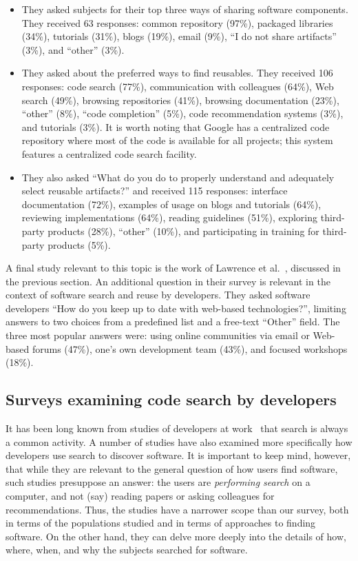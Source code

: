 \documentclass{casicswhitepaper}
\begin{document}
\begin{itemize}

\item They asked subjects for their top three ways of sharing software components.  They received 63 responses: common repository (97\%), packaged libraries (34\%), tutorials (31\%), blogs (19\%), email (9\%), ``I do not share artifacts'' (3\%), and ``other'' (3\%).

\item They asked about the preferred ways to find reusables.  They received 106 responses: code search (77\%), communication with colleagues (64\%), Web search (49\%), browsing repositories (41\%), browsing documentation (23\%), ``other'' (8\%), ``code completion'' (5\%), code recommendation systems (3\%), and tutorials (3\%).  It is worth noting that Google has a centralized code repository where most of the code is available for all projects; this system features a centralized code search facility.

\item They also asked ``What do you do to properly understand and adequately select reusable artifacts?'' and received 115 responses: interface documentation (72\%), examples of usage on blogs and tutorials (64\%), reviewing implementations (64\%), reading guidelines (51\%), exploring third-party products (28\%), ``other'' (10\%), and participating in training for third-party products (5\%).

\end{itemize}

A final study relevant to this topic is the work of Lawrence et al.~\cite{lawrence2015science, lawrence2014who}, discussed in the previous section.  An additional question in their survey is relevant in the context of software search and reuse by developers.  They asked software developers ``How do you keep up to date with web-based technologies?'', limiting answers to two choices from a predefined list and a free-text ``Other'' field.  The three most popular answers were: using online communities via email or Web-based forums (47\%), one's own development team (43\%), and focused workshops (18\%).


\subsection{Surveys examining code search by developers}

It has been long known from studies of developers at work~\cite[e.g.,][]{singer1997examination} that search is always a common activity.  A number of studies have also examined more specifically how developers use search to discover software.  It is important to keep mind, however, that while they are relevant to the general question of how users find software, such studies presuppose an answer: the users are \emph{performing search} on a computer, and not (say) reading papers or asking colleagues for recommendations.  Thus, the studies have a narrower scope than our survey, both in terms of the populations studied and in terms of approaches to finding software.  On the other hand, they can delve more deeply into the details of how, where, when, and why the subjects searched for software.
\end{document}

